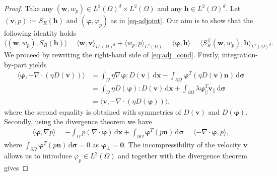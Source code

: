 \documentclass[final,leqno]{scrarticle}
\newcommand{\lzo}{L^2(\Omega)}
\newcommand{\lzd}{{L^2(\Omega)^d}}
\newcommand{\dd}{\, \mathrm{d}}
\begin{document}
\begin{proof}  Take any $(\mathbf{w},w_p)\in \lzd \times \lzo$ and any $\mathbf{h}\in\lzd$. 
    Let $(\mathbf{v},p):=S_R(\mathbf{h})$ and $\left(\boldsymbol{\varphi},\varphi_p\right)$ as in \eqref{eq-adjoint}.
    Our aim is to show that the following identity holds
    \begin{equation}
    \langle (\mathbf{w},w_p),S_R(\mathbf{h})\rangle = 
        \langle \mathbf{w}, \mathbf{v} \rangle_{\lzd} + \langle w_p , p \rangle_{\lzo} = \langle \boldsymbol{\varphi} , \mathbf{h} \rangle =
        \langle S_R^{\#} (\mathbf{w},w_p), \mathbf{h} \rangle_{\lzd}.
        \label{eq:adj_cond}
    \end{equation}
    We proceed by rewriting the right-hand side of \eqref{eq:adj_cond}. Firstly, integration-by-part yields
    \begin{equation}
    \begin{split}
         \langle \boldsymbol{\varphi}, - \nabla \cdot (\eta D(\mathbf{v})) \rangle &= \int_\Omega \eta \nabla \boldsymbol{\varphi} : D(\mathbf{v}) \dd \mathbf{x} - \int_{\partial \Omega} \boldsymbol{\varphi}^{T} (\eta D(\mathbf{v}) \mathbf{n} ) \dd \boldsymbol{\sigma} \\
         & = \int_\Omega \eta D(\boldsymbol{\varphi}) : D(\mathbf{v}) \dd \mathbf{x} + \int_{\partial\Omega} \lambda \boldsymbol{\varphi}_{||}^T \mathbf{v}_{||} \dd \boldsymbol{\sigma} \\
         & = \langle \mathbf{v}, - \nabla \cdot (\eta D(\boldsymbol{\varphi}) )\rangle,
         \label{eq:srad_proof_v}
    \end{split}
    \end{equation}
    where the second equality is obtained with symmetries of $D(\mathbf{v})$ and $D(\boldsymbol{\varphi})$.
    Secondly, using the divergence theorem we have 
    \begin{equation}\label{eq:srad_proof_p}
        \begin{split}
            \langle \boldsymbol{\varphi}, \nabla p\rangle = - \int_\Omega  p (\nabla \cdot\boldsymbol{\varphi}) \dd \mathbf{x} + \int_{\partial\Omega} \boldsymbol{\varphi}^T (p \mathbf{n}) \dd \boldsymbol{\sigma} 
                                = \langle - \nabla \cdot \boldsymbol{\varphi}, p\rangle,
        \end{split}
    \end{equation}
    where $\int_{\partial\Omega} \boldsymbol{\varphi}^T (p \mathbf{n}) \dd \boldsymbol{\sigma} = 0$ as $\boldsymbol{\varphi}_\bot = \mathbf{0}$.
    The incompressibility of the velocity $\mathbf{v}$ allows us to introduce $\varphi_p\in\lzo$ and together with the divergence theorem gives

\end{proof}
\end{document}
